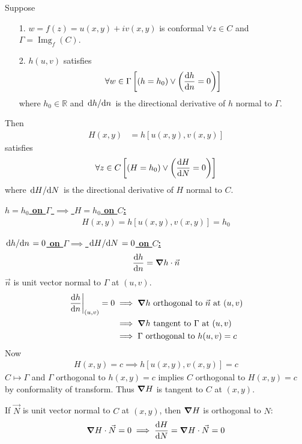 \documentclass[12pt, english]{book}
\makeatletter
\renewenvironment{proof}[1][\proofname]{\par
	\pushQED{\qed}%
	\normalfont \topsep6\p@\@plus6\p@\relax
	\list{}{%
		\settowidth{\leftmargin}{\itshape\proofname:\hskip\labelsep}%
		\setlength{\labelwidth}{0pt}%
		\setlength{\itemindent}{-\leftmargin}%
		}%
	\item[\hskip\labelsep\itshape#1\@addpunct{:}]\ignorespaces
	}{\popQED\endlist\@endpefalse}
\makeatother
\begin{document}
	\begin{theorem}
		\label{Transformation of Boundary Conditions Theorem - Complex}
		Suppose 
		\begin{itemize}
			\item[1.] \(w = f(z) = u(x,y) + iv(x,y)\) is conformal \(\forall z \in C\) and \(\Gamma = \operatorname{Img}_f(C)\).
			\item[2.] \(h(u,v)\) satisfies 
				\begin{align*}
					\forall w \in \Gamma 
					\left[(h = h_0) \lor \left(\dv{h}{n} = 0\right)\right]
				\end{align*}
				where \(h_0 \in \mathbb{R}\) and \(\dv*{h}{n}\) is the directional derivative of \(h\) normal to \(\Gamma\).
		\end{itemize}
		Then
		\begin{align*}
			H(x,y) &= h[u(x,y), v(x,y)]
		\end{align*}
		satisfies
		\begin{align*}
			\forall z \in C 
			\left[(H = h_0) \lor \left(\dv{H}{N} = 0\right)\right]
		\end{align*}
		where \(\dv*{H}{N}\) is the directional derivative of \(H\) normal to \(C\).
	\end{theorem}
	\begin{proof}
		\underline{\textbf{\(h = h_0\) on \(\Gamma\) \(\implies\) \(H=h_0\) on \(C\):}} 
		\begin{align*}
			H(x,y) = h[u(x,y), v(x,y)] = h_0
		\end{align*}
		
		\underline{\textbf{\(\dv*{h}{n} = 0\) on \(\Gamma \implies \) \(\dv*{H}{N} = 0\) on \(C\):}}
		\begin{align*}
			\dv{h}{n} = \grad{h} \cdot \vec{n}
		\end{align*}
		\(\vec{n}\) is unit vector normal to \(\Gamma\) at \((u,v)\). 
		\begin{align*}
			\eval{\dv{h}{n}}_{(u,v)} = 0
			&\implies \grad{h} \text{ orthogonal to } \vec{n} \text{ at } (u,v) \\
			&\implies \grad{h} \text{ tangent to } \Gamma \text{ at } (u,v) \\
			&\implies \Gamma \text{ orthogonal to } h(u,v) = c
		\end{align*}
		Now
		\begin{align*}
			H(x,y) = c
			\implies h[u(x,y), v(x,y)] = c
		\end{align*}
		\(C \mapsto \Gamma\) and \(\Gamma\) orthogonal to \(h(x,y) = c\) implies \(C\) orthogonal to \(H(x,y) = c\) by conformality of transform. Thus \(\grad{H}\) is tangent to \(C\) at \((x,y)\).
		
		If \(\vec{N}\) is unit vector normal to \(C\) at \((x,y)\), then \(\grad{H}\) is orthogonal to \(N\):
		\begin{align*}
			\grad{H} \cdot \vec{N} = 0
			\implies \dv{H}{N} = \grad{H}\cdot \vec{N} = 0
		\end{align*}
	\end{proof}
	
\end{document}
